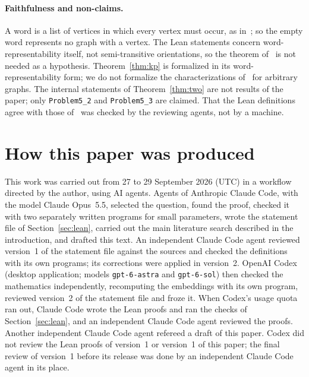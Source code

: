 \documentclass[11pt]{article}
\theoremstyle{remark}
\begin{document}
\paragraph{Faithfulness and non-claims.}
A word is a list of vertices in which every vertex must occur, as
in~\cite{alsh}; so the empty word represents no graph with a vertex. The Lean
statements concern word-representability itself, not semi-transitive
orientations, so the theorem of~\cite{hkp} is not needed as a hypothesis.
Theorem~\ref{thm:kp} is formalized in its word-representability form; we do
not formalize the characterizations of~\cite{hameed,kp} for arbitrary graphs.
The internal statements of Theorem~\ref{thm:two} are not results of the paper;
only \texttt{Problem5\_2} and \texttt{Problem5\_3} are claimed.
That the Lean definitions agree with those of~\cite{alsh} was checked by the
reviewing agents, not by a machine.

\section*{How this paper was produced}
This work was carried out from 27 to 29 September 2026 (UTC) in a workflow
directed by the author, using AI agents. Agents of Anthropic Claude Code,
with the model Claude Opus~5.5, selected the question, found the proof,
checked it with two separately written programs for small parameters, wrote
the statement file of Section~\ref{sec:lean}, carried out the main
literature search described in the introduction, and drafted this text. An independent
Claude Code agent reviewed version~1 of the statement file against the
sources and checked the definitions with its own programs; its corrections
were applied in version~2. OpenAI Codex (desktop application; models
\texttt{gpt-6-astra} and \texttt{gpt-6-sol}) then checked the
mathematics independently, recomputing the embeddings with its own program,
reviewed version~2 of the statement file and froze it. When Codex's usage
quota ran out, Claude Code wrote the Lean proofs and ran the checks of
Section~\ref{sec:lean}, and an independent Claude Code agent reviewed the
proofs. Another independent Claude Code agent refereed a draft of this
paper. Codex did not review the Lean proofs of version~1 or version~1 of this
paper; the final review of version~1 before its release was done by an independent Claude Code agent in its
place.
\end{document}
